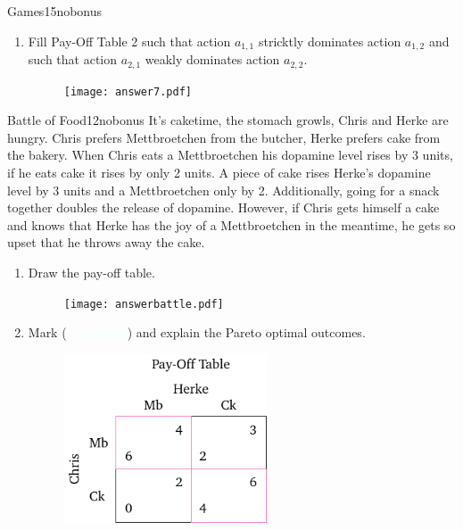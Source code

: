 \documentclass[twoside,english,colorbacktitle,accentcolor=tud9c,10pt]{tudexercise}
\begin{document}
\begin{questions}
\begin{question}{Games}{15}{nobonus}
\begin{enumerate}
		\item Fill Pay-Off Table 2 such that action $a_{1,1}$ stricktly dominates action $a_{1,2}$ and such that action $a_{2,1}$ weakly dominates action $a_{2,2}$.
		\begin{figure}[H]
		\centering
		\texttt{[image: answer7.pdf]}
		\end{figure}
	\end{enumerate}

\end{question}

	
\begin{question}{Battle of Food}{12}{nobonus}
	It's caketime, the stomach growls, Chris and Herke are hungry.
	Chris prefers Mettbroetchen from the butcher, Herke prefers cake from the bakery.
	When Chris eats a Mettbroetchen his dopamine level rises by 3 units, if he eats cake it rises by only 2 units.
	A piece of cake rises Herke's dopamine level by 3 units and a Mettbroetchen only by 2.
	Additionally, going for a snack together doubles the release of dopamine.
	However, if Chris gets himself a cake and knows that Herke has the joy of a Mettbroetchen in the meantime, he gets so upset that he throws away the cake.

	\begin{enumerate}
		\item Draw the pay-off table.
		\begin{figure}[H]
		\centering
		\texttt{[image: answerbattle.pdf]}
		\end{figure}
		\item Mark (\textcolor{azure}{in magenta}) and explain the Pareto optimal outcomes.
		\begin{figure}[H]
		\centering
		\includegraphics[height=5cm]{answerbattlePO.pdf}
		\end{figure}
		

\end{enumerate}
\end{question}
\end{questions}
\end{document}
